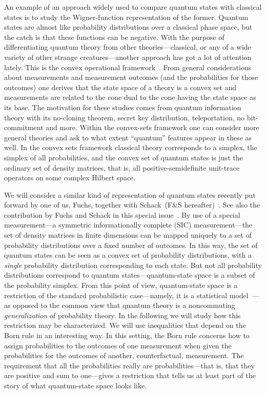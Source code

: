 \documentclass[letterpaper,11pt]{article}
\begin{document}
An example of an approach widely used to compare quantum states with classical states is to study the Wigner-function representation of the former. Quantum states are almost like probability distributions over a classical phase space, but the catch is that these functions can be negative. With the purpose of differentiating quantum theory from other theories---classical, or any of a wide variety of other strange creatures---another approach has got a lot of attention lately. This is the convex operational framework~\cite{Barrett07,Barnum06,Barnum08}. From general considerations about measurements and measurement outcomes (and the probabilities for those outcomes) one derives that the state space of a theory is a convex set and measurements are related to the cone dual to the cone having the state space as its base. The motivation for these studies comes from quantum information theory with its no-cloning theorem, secret key distribution, teleportation, no bit-commitment and more. Within the convex-sets framework one can consider more general theories and ask to what extent ``quantum'' features appear in these as well.  In the convex sets framework classical theory corresponds to a simplex, the simplex of all probabilities, and the convex set of quantum states is just the ordinary set of density matrices, that is, all positive-semidefinite unit-trace operators on some complex Hilbert space.

We will consider a similar kind of representation of quantum states recently put forward by one of us, Fuchs, together with Schack~(F\&S hereafter)~\cite{Fuchs&Schack}. See also the contribution by Fuchs and Schack in this special issue~\cite{Fuchs&SchackII}. By use of a special measurement---a symmetric informationally complete (SIC) measurement---the set of density matrices in finite dimensions can be mapped uniquely to a set of probability distributions over a fixed number of outcomes. In this way, the set of quantum states can be seen as a convex set of probability distributions, with a {\it single\/} probability distribution corresponding to each state. But not all probability distributions correspond to quantum states---quantum-state space is a subset of the probability simplex.  From this point of view, quantum-state space is a restriction of the standard probabilistic case---namely, it is a statistical model~\cite{Sullivant}---as opposed to the common view that quantum theory is a noncommuting {\it generalization\/} of probability theory. In the following we will study how this restriction may be characterized. We will use inequalities that depend on the Born rule in an interesting way. In this setting, the Born rule concerns how to assign probabilities to the outcomes of one measurement when given the probabilities for the outcomes of another, counterfactual, measurement. The requirement that all the probabilities really are probabilities---that is, that they are positive and sum to one---gives a restriction that tells us at least part of the story of what quantum-state space looks like.
\end{document}

